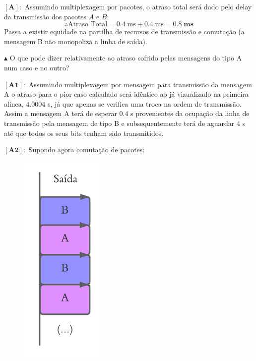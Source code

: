 \noindent $\pmb{[\textbf{A}]:}$ Assumindo multiplexagem por pacotes, o atraso total será dado pelo delay da transmissão dos pacotes $A$ e $B$:
$$
    \boxed{\therefore \text{Atraso Total} = 0.4\; \text{ms} + 0.4\; \text{ms} = \pmb{0.8}\; \textbf{ms}}
$$
\noindent Passa a existir equidade na partilha de recursos de transmissão e comutação (a mensagem B não monopoliza a linha de saída).

\vspace{1.5 em}
\noindent $\blacktriangle$ O que pode dizer relativamente ao atraso sofrido pelas mensagens do tipo A num caso e no outro?

\vspace{0.75 em}
\noindent $\pmb{[\textbf{A1}]:}$ Assumindo multiplexagem por mensagem para transmissão da mensagem A o atraso para o pior caso calculado será idêntico ao já vizualizado na primeira alínea, $4.0004$ s, já que apenas se verifica uma troca na ordem de transmissão. Assim a mensagem A terá de esperar $0.4$ s provenientes da ocupação da linha de transmissão pela mensagem de tipo B e subsequentemente terá de aguardar $4$ s até que todos os seus bits tenham sido transmitidos. 

\vspace{1 em}
\noindent $\pmb{[\textbf{A2}]:}$ Supondo agora comutação de pacotes:

\vspace{-0.5em}
\begin{figure}[H]
    \centering
    \includegraphics[width = 0.15\linewidth]{img/1/Interleave.png}
    \quad{}
    \label{fig:Interleave}
\end{figure}

